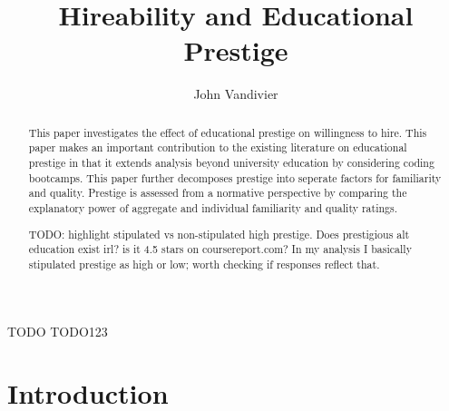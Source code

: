 \documentclass[review]{elsarticle}
\begin{document}
\begin{frontmatter}

    \title{
        Hireability and Educational Prestige
    }

    \author[mymainaddress]{John Vandivier}
    \address[mymainaddress]{4400 University Dr, Fairfax, VA 22030}

    \begin{abstract}
        This paper investigates the effect of educational prestige on willingness to hire.
        This paper makes an important contribution to the existing literature on educational prestige
        in that it extends analysis beyond university education by considering coding bootcamps.
        This paper further decomposes prestige into seperate factors for familiarity and quality.
        Prestige is assessed from a normative perspective by comparing the explanatory power of aggregate and individual familiarity and quality ratings.

        TODO: highlight stipulated vs non-stipulated high prestige. Does prestigious alt education exist irl? is it 4.5 stars on coursereport.com?
        In my analysis I basically stipulated prestige as high or low; worth checking if responses reflect that.

    \end{abstract}

    \begin{keyword}
        TODO
        \MSC[2010] TODO123 %
    \end{keyword}

\end{frontmatter}

\pagebreak
\linenumbers

\section{Introduction}

\end{document}
